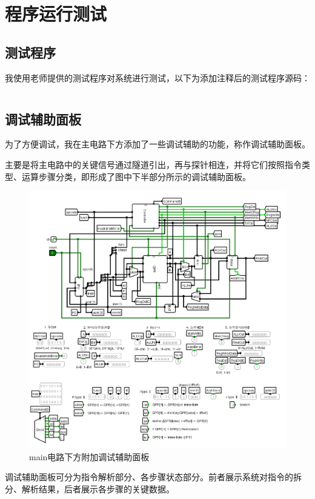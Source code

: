 \documentclass[main.tex]{subfiles}
\begin{document}
\section{程序运行测试}

\subsection{测试程序}
我使用老师提供的测试程序对系统进行测试，以下为添加注释后的测试程序源码：
\inputminted[linenos]{gas}{p1-test-commented.asm}

\clearpage

\subsection{调试辅助面板}
为了方便调试，我在主电路下方添加了一些调试辅助的功能，称作调试辅助面板。

主要是将主电路中的关键信号通过隧道引出，再与探针相连，并将它们按照指令类型、运算步骤分类，即形成了图中下半部分所示的调试辅助面板。

\begin{figure}[H]
\centering
\includegraphics[width=\textwidth]{images/main-circuit.png}
\caption{main电路下方附加调试辅助面板}
\end{figure}

调试辅助面板可分为指令解析部分、各步骤状态部分。前者展示系统对指令的拆分、解析结果，后者展示各步骤的关键数据。
\end{document}
